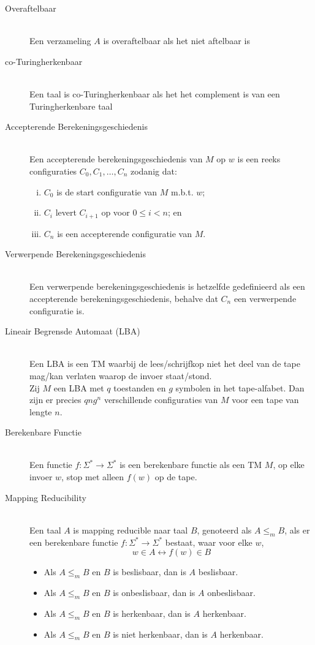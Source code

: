 \documentclass[]{article}
\begin{document}
\begin{itemize}
\begin{description}
	\item[Overaftelbaar] \hfill \\
	Een verzameling $A$ is overaftelbaar als het niet aftelbaar is
	
	\item[co-Turingherkenbaar] \hfill \\
	Een taal is co-Turingherkenbaar als het het complement is van een Turingherkenbare taal
	
	\item[Accepterende Berekeningsgeschiedenis] \hfill \\
	Een accepterende berekeningsgeschiedenis van $M$ op $w$ is een reeks configuraties $C_0,C_1,\dots,C_n$ zodanig dat:
	\begin{enumerate}[i.]
		\item $C_0$ is de start configuratie van $M$ m.b.t. $w$;
		\item $C_i$ levert $C_{i+1}$ op voor $0 \leq i < n$; en
		\item $C_n$ is een accepterende configuratie van $M$.
	\end{enumerate}
	
	\item[Verwerpende Berekeningsgeschiedenis] \hfill \\
	Een verwerpende berekeningsgeschiedenis is hetzelfde gedefinieerd als een accepterende berekeningsgeschiedenis, behalve dat $C_n$ een verwerpende configuratie is.
	
	\item[Lineair Begrensde Automaat (LBA)] \hfill \\
	Een LBA is een TM waarbij de lees/schrijfkop niet het deel van de tape mag/kan verlaten waarop de invoer staat/stond.\\
	Zij $M$ een LBA met $q$ toestanden en $g$ symbolen in het tape-alfabet. Dan zijn er precies $qng^n$ verschillende configuraties van $M$ voor een tape van lengte $n$.
	
	\item[Berekenbare Functie] \hfill \\
	Een functie $f: \Sigma^* \rightarrow \Sigma^*$ is een berekenbare functie als een TM $M$, op elke invoer $w$, stop met alleen $f(w)$ op de tape.
	
	\item[Mapping Reducibility] \hfill \\
	Een taal $A$ is mapping reducible naar taal $B$, genoteerd als $A \leq_m B$, als er een berekenbare functie $f: \Sigma^* \rightarrow \Sigma^*$ bestaat, waar voor elke $w$,
	$$w \in A \longleftrightarrow f(w) \in B$$
	\begin{itemize}
		\item Als $A \leq_m B$ en $B$ is beslisbaar, dan is $A$ beslisbaar.
		\item Als $A \leq_m B$ en $B$ is onbeslisbaar, dan is $A$ onbeslisbaar.
		\item Als $A \leq_m B$ en $B$ is herkenbaar, dan is $A$ herkenbaar.
		\item Als $A \leq_m B$ en $B$ is niet herkenbaar, dan is $A$ herkenbaar.
	\end{itemize}
	

\end{description}
\end{itemize}
\end{document}
